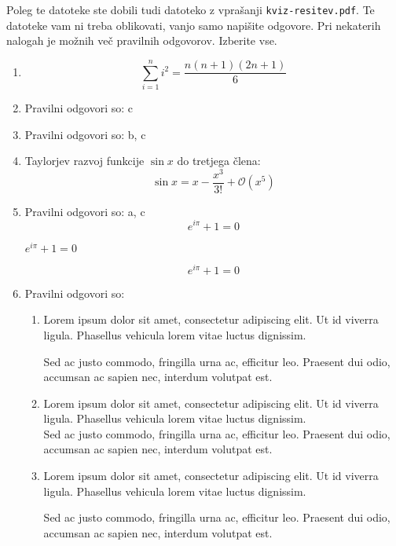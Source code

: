 \documentclass[11pt]{article}
\begin{document}
Poleg te datoteke ste dobili tudi datoteko z vprašanji \texttt{kviz-resitev.pdf}.
Te datoteke vam ni treba oblikovati, vanjo samo napišite odgovore.
Pri nekaterih nalogah je možnih več pravilnih odgovorov. Izberite vse.

\begin{enumerate}
    \item $$\sum_{i=1}^{n} i^2 = \frac{n(n + 1)(2n + 1)}{6}$$

    \item Pravilni odgovori so: c
    
    \item Pravilni odgovori so: b, c%
    
    \item Taylorjev razvoj funkcije $\sin x$ do tretjega člena: $$\sin x = x - \frac{x^3}{3!} + \mathcal{O}(x^5)$$

    \item Pravilni odgovori so: a, c %
      \[ e^{i \pi} + 1 = 0 \]
      \begin{center}
          \( e^{i \pi} + 1 = 0 \)
      \end{center}
      \begin{equation*}
          e^{i \pi} + 1 = 0
      \end{equation*}

    \item Pravilni odgovori so: %
        \begin{enumerate}
            \item {
                Lorem ipsum dolor sit amet, consectetur adipiscing elit. Ut id viverra ligula. Phasellus vehicula lorem vitae luctus dignissim. 
                
                Sed ac justo commodo, fringilla urna ac, efficitur leo. Praesent dui odio, accumsan ac sapien nec, interdum volutpat est. 
            }
            \item {
                Lorem ipsum dolor sit amet, consectetur adipiscing elit. Ut id viverra ligula. Phasellus vehicula lorem vitae luctus dignissim. \\
                Sed ac justo commodo, fringilla urna ac, efficitur leo. Praesent dui odio, accumsan ac sapien nec, interdum volutpat est. 
            }
            \item {
                Lorem ipsum dolor sit amet, consectetur adipiscing elit. Ut id viverra ligula. Phasellus vehicula lorem vitae luctus dignissim. \par
                Sed ac justo commodo, fringilla urna ac, efficitur leo. Praesent dui odio, accumsan ac sapien nec, interdum volutpat est. 
            }
        \end{enumerate}
    

\end{enumerate}
\end{document}
